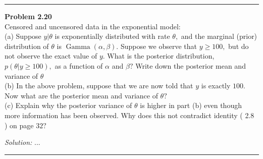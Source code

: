 \documentclass[a4paper, 11pt]{article}
\newenvironment{problem}[2][Problem]
    { \begin{mdframed}[backgroundcolor=gray!20] \textbf{#1 #2} \\}
    {  \end{mdframed}}
\newenvironment{solution}
    {\textit{Solution:}}
    {}
\begin{document}
\noindent\rule{7in}{2.8pt}
\begin{problem}{2.20}
 Censored and uncensored data in the exponential model:\\
  (a) Suppose $y | \theta$ is exponentially distributed with rate $\theta,$ and the marginal (prior) distribution of $\theta$ is $\operatorname{Gamma}(\alpha, \beta) .$ Suppose we observe that $y \geq 100,$ but do not observe the exact value of $y .$ What is the posterior distribution, $p(\theta | y \geq 100),$ as a function of $\alpha$ and $\beta ?$ Write down the posterior mean and variance of $\theta$\\
  (b) In the above problem, suppose that we are now told that $y$ is exactly $100 .$ Now what are the posterior mean and variance of $\theta ?$\\
  (c) Explain why the posterior variance of $\theta$ is higher in part (b) even though more information has been observed. Why does this not contradict identity ( 2.8 ) on page
  $32 ?$
\end{problem}
\begin{solution}
...
\end{solution}

\noindent\rule{7in}{2.8pt}

\end{document}

